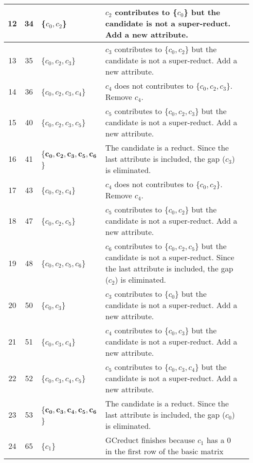 \documentclass[number,preprint,review,12pt]{elsarticle}
\begin{document}
\begin{table}[!htb]
\begin{tabular}{|c|c|l|l|l|}
					\hline
			12 & 34 & \{$c_0,c_2$\}				& \multicolumn{1}{p{8.5cm}|}{$c_2$ contributes to \{$c_0$\} but the candidate is not a super-reduct. Add a new attribute.}\\
					\hline
			13 & 35 & \{$c_0,c_2,c_3$\}	    	& \multicolumn{1}{p{8.5cm}|}{$c_3$ contributes to \{$c_0,c_2$\} but the candidate is not a super-reduct. Add a new attribute.}\\
					\hline
			14 & 36 & \{$c_0,c_2,c_3,c_4$\}		& \multicolumn{1}{p{8.5cm}|}{$c_4$ does not contributes to \{$c_0,c_2,c_3$\}. Remove $c_4$.}\\
					\hline
			15 & 40 & \{$c_0,c_2,c_3,c_5$\}		& \multicolumn{1}{p{8.5cm}|}{$c_5$ contributes to \{$c_0,c_2,c_3$\} but the candidate is not a super-reduct. Add a new attribute.}\\
					\hline
			16 & 41 & \{$\mathbf{c_0,c_2,c_3,c_5,c_6}$\} & \multicolumn{1}{p{8.5cm}|}{The candidate is a reduct. Since the last attribute is included, the gap ($c_3$) is eliminated.}\\
					\hline
			17 & 43 & \{$c_0,c_2,c_4$\}			& \multicolumn{1}{p{8.5cm}|}{$c_4$ does not contributes to \{$c_0,c_2$\}. Remove $c_4$.}\\
					\hline
			18 & 47 & \{$c_0,c_2,c_5$\}			& \multicolumn{1}{p{8.5cm}|}{$c_5$ contributes to \{$c_0,c_2$\} but the candidate is not a super-reduct. Add a new attribute.}\\
					\hline
			19 & 48 & \{$c_0,c_2,c_5,c_6$\}		& \multicolumn{1}{p{8.5cm}|}{$c_6$ contributes to \{$c_0,c_2,c_5$\} but the candidate is not a super-reduct. Since the last attribute is included, the gap ($c_2$) is eliminated.}\\
					\hline
			20 & 50 & \{$c_0,c_3$\}				& \multicolumn{1}{p{8.5cm}|}{$c_3$ contributes to \{$c_0$\} but the candidate is not a super-reduct. Add a new attribute.}\\    
					\hline		
			21 & 51 & \{$c_0,c_3,c_4$\}			& \multicolumn{1}{p{8.5cm}|}{$c_4$ contributes to \{$c_0,c_3$\} but the candidate is not a super-reduct. Add a new attribute.}\\
					\hline
			22 & 52 & \{$c_0,c_3,c_4,c_5$\}		& \multicolumn{1}{p{8.5cm}|}{$c_5$ contributes to \{$c_0,c_3,c_4$\} but the candidate is not a super-reduct. Add a new attribute.}\\
					\hline
			23 & 53 & \{$\mathbf{c_0,c_3,c_4,c_5,c_6}$\} & \multicolumn{1}{p{8.5cm}|}{The candidate is a reduct. Since the last attribute is included, the gap ($c_0$) is eliminated.}\\
					\hline
			24 & 65 & \{$c_1$\} 				& \multicolumn{1}{p{8.5cm}|}{GCreduct finishes because $c_1$ has a 0 in the first row of the basic matrix} \\ %
			\hline
		\end{tabular}
	\end{table}
		
\end{document}
